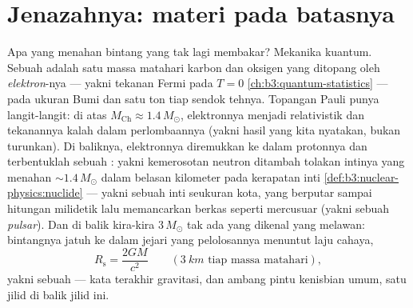 \section{Jenazahnya: materi pada batasnya}

\begin{proposition}\label{prop:b3:astrophysics:compact}
Apa yang menahan bintang yang tak lagi membakar? Mekanika kuantum. Sebuah
\emph{} adalah satu massa matahari karbon dan oksigen yang ditopang
oleh \emph{ elektron}-nya --- yakni tekanan Fermi
pada $T = 0$ \cref{ch:b3:quantum-statistics} --- pada ukuran
Bumi dan satu ton tiap sendok tehnya. Topangan Pauli punya
langit-langit: di atas \emph{} $M_{\text{Ch}}
\approx 1.4\,M_\odot$, elektronnya menjadi relativistik dan
tekanannya kalah dalam perlombaannya (yakni hasil yang kita nyatakan, bukan turunkan). Di baliknya,
elektronnya diremukkan ke dalam protonnya dan terbentuklah sebuah \emph{}:
yakni kemerosotan neutron ditambah tolakan intinya yang menahan
$\sim1.4\,M_\odot$ dalam belasan kilometer pada kerapatan inti
\cref{def:b3:nuclear-physics:nuclide} --- yakni sebuah inti
seukuran kota, yang berputar sampai hitungan milidetik lalu memancarkan berkas seperti
mercusuar (yakni sebuah \emph{pulsar}). Dan di balik kira-kira $3\,M_\odot$
tak ada yang dikenal yang melawan: bintangnya jatuh ke dalam jejari yang
pelolosannya menuntut laju cahaya,
\[
R_{\text{s}} = \frac{2GM}{c^2}
\qquad (\qty{3}{km}\text{ tiap massa matahari}) ,
\]
yakni sebuah \emph{} --- kata terakhir gravitasi, dan ambang pintu
kenisbian umum, satu jilid di balik jilid ini.
\end{proposition}
\admitted

